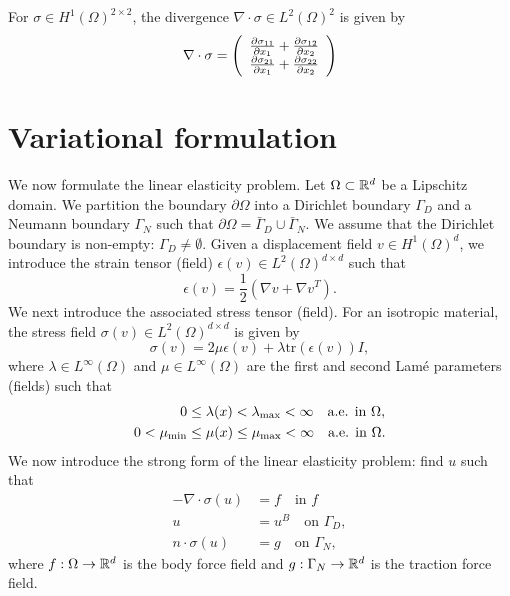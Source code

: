 \begin{corollary}
  For $\sigma \in H^1(\Omega)^{2 \times 2}$, the divergence $\nabla \cdot \sigma \in L^2(\Omega)^2$ is given by
  \begin{equation*}
    \nabla \cdot \sigma =
    \bmat{c}
    \pp{\sigma_{11}}{x_1} + \pp{\sigma_{12}}{x_2} \\
    \pp{\sigma_{21}}{x_1} + \pp{\sigma_{22}}{x_2}
    \emat
  \end{equation*}
\end{corollary}
\section{Variational formulation}
We now formulate the linear elasticity problem. Let $\Omega \subset \RR^d$ be a Lipschitz domain. We partition the boundary $\partial \Omega$ into a Dirichlet boundary $\Gamma_D$ and a Neumann boundary $\Gamma_N$ such that $\partial \Omega = \bar{\Gamma}_D \cup \bar{\Gamma}_N$. We assume that the Dirichlet boundary is non-empty: $\Gamma_D \neq \emptyset$. Given a displacement field $v \in H^1(\Omega)^d$, we introduce the strain tensor (field) $\epsilon(v) \in L^2(\Omega)^{d \times d}$ such that
\begin{equation*}
  \epsilon(v) = \frac{1}{2} (\nabla v + \nabla v^T).
\end{equation*}
We next introduce the associated stress tensor (field).  For an isotropic material, the stress field $\sigma(v) \in L^2(\Omega)^{d \times d}$ is given by
\begin{equation*}
  \sigma(v) = 2 \mu \epsilon(v) + \lambda \text{tr}(\epsilon(v)) I,
\end{equation*}
where $\lambda \in L^\infty(\Omega)$ and $\mu \in L^\infty(\Omega)$ are the first and second Lam\'e parameters (fields) such that
\begin{align*}
  0 &\leq \lambda(x) < \lambda_{\rm max} < \infty \quad \text{a.e. in } \Omega,\\
  0 < \mu_{\rm min} &\leq \mu(x) \leq \mu_{\rm max} < \infty \quad \text{a.e. in } \Omega.
\end{align*}
 We now introduce the strong form of the linear elasticity problem: find $u$ such that
\begin{align*}
  - \nabla \cdot \sigma(u) &= f \quad \text{in } f \\
  u &= u^B \quad \text{on } \Gamma_{D}, \\
  n \cdot \sigma(u) &= g \quad \text{on } \Gamma_{N},
\end{align*}
where $f: \Omega \to \RR^d$ is the body force field and $g: \Gamma_N \to \RR^d$ is the traction force field. 

